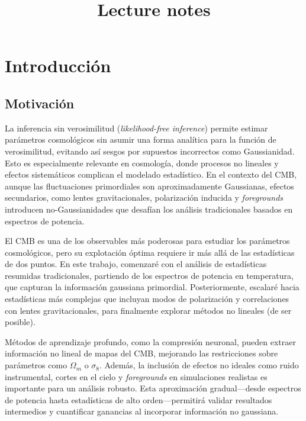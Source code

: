 \documentclass[11pt]{article}
\title{Lecture notes}
\author{}
\date{}
\begin{document}
\setlength{\parindent}{0pt}
\setlength{\parskip}{1ex}

\maketitle

\tableofcontents

\newpage

\section{Introducción}
\subsection{Motivación}
La inferencia sin verosimilitud (\textit{likelihood-free inference}) permite estimar parámetros cosmológicos sin asumir una forma analítica para la función de verosimilitud, evitando así sesgos por supuestos incorrectos como Gaussianidad. Esto es especialmente relevante en cosmología, donde procesos no lineales y efectos sistemáticos complican el modelado estadístico. En el contexto del CMB, aunque las fluctuaciones primordiales son aproximadamente Gaussianas, efectos secundarios, como lentes gravitacionales, polarización inducida y \textit{foregrounds} introducen no-Gaussianidades que desafían los análisis tradicionales basados en espectros de potencia.

El CMB es una de los observables más poderosas para estudiar los parámetros cosmológicos, pero su explotación óptima requiere ir más allá de las estadísticas de dos puntos. En este trabajo, comenzaré con el análisis de estadísticas resumidas tradicionales, partiendo de los espectros de potencia en temperatura, que capturan la información gaussiana primordial. Posteriormente, escalaré hacia estadísticas más complejas que incluyan modos de polarización y correlaciones con lentes gravitacionales, para finalmente explorar métodos no lineales (de ser posible).

Métodos de aprendizaje profundo, como la compresión neuronal, pueden extraer información no lineal de mapas del CMB, mejorando las restricciones sobre parámetros como $\Omega_m$ o $\sigma_8$. Además, la inclusión de efectos no ideales como ruido instrumental, cortes en el cielo y \textit{foregrounds} en simulaciones realistas es importante para un análisis robusto. Esta aproximación gradual---desde espectros de potencia hasta estadísticas de alto orden---permitirá validar resultados intermedios y cuantificar ganancias al incorporar información no gaussiana.
\end{document}
